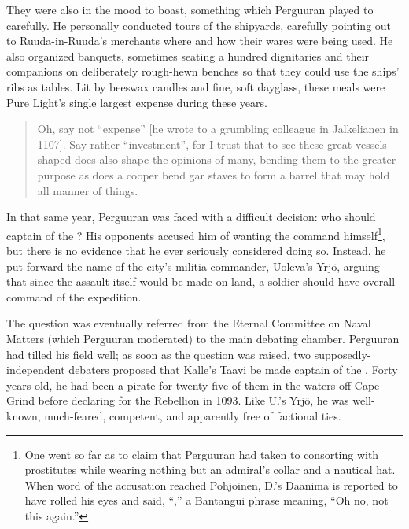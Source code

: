 \documentclass[12pt]{report}
\begin{document}
They were also in the mood to boast, something which Perguuran played
to carefully.  He personally conducted tours of the shipyards,
carefully pointing out to Ruuda-in-Ruuda's merchants where and how
their wares were being used.  He also organized banquets, sometimes
seating a hundred dignitaries and their companions on deliberately
rough-hewn benches so that they could use the ships' ribs as tables.
Lit by beeswax candles and fine, soft dayglass, these meals were Pure
Light's single largest expense during these years.

\begin{quotation}
Oh, say not ``expense'' [he wrote to a grumbling colleague in
Jalkelianen in 1107].  Say rather ``investment'', for I trust that to
see these great vessels shaped does also shape the opinions of many,
bending them to the greater purpose as does a cooper bend gar staves
to form a barrel that may hold all manner of things.
\end{quotation}

In that same year, Perguuran was faced with a difficult decision: who
should captain of the ?  His opponents accused
him of wanting the command himself\footnote{One went so far as to
claim that Perguuran had taken to consorting with prostitutes while
wearing nothing but an admiral's collar and a nautical hat.  When word
of the accusation reached Pohjoinen, D.'s Daanima is reported to have
rolled his eyes and said, ``,'' a Bantangui phrase
meaning, ``Oh no, not this again.''}, but there is no evidence that he
ever seriously considered doing so.  Instead, he put forward the name
of the city's militia commander, Uoleva's Yrj\"{o}, arguing that since
the assault itself would be made on land, a soldier should have
overall command of the expedition.

The question was eventually referred from the Eternal Committee on
Naval Matters (which Perguuran moderated) to the main debating
chamber.  Perguuran had tilled his field well; as soon as the question
was raised, two supposedly-independent debaters proposed that Kalle's
Taavi be made captain of the .  Forty years old,
he had been a pirate for twenty-five of them in the waters off Cape
Grind before declaring for the Rebellion in 1093.  Like U.'s Yrj\"{o},
he was well-known, much-feared, competent, and apparently free of
factional ties.
\end{document}
